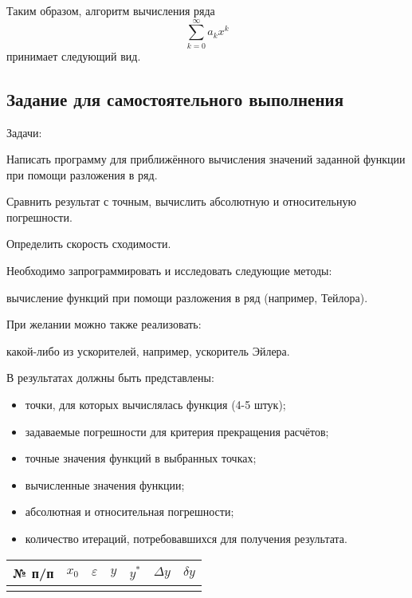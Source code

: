 Таким образом, алгоритм вычисления ряда 
\[
\sum_{k=0}^{\infty}a_{k}x^{k}
\]
принимает следующий вид.


%
%



\subsection{Задание для самостоятельного выполнения}

Задачи:

Написать программу для приближённого вычисления значений заданной
функции при помощи разложения в ряд.

Сравнить результат с точным, вычислить абсолютную и относительную
погрешности.

Определить скорость сходимости.

Необходимо запрограммировать и исследовать следующие методы:

вычисление функций при помощи разложения в ряд (например, Тейлора).

При желании можно также реализовать:

какой-либо из ускорителей, например, ускоритель Эйлера.

В результатах должны быть представлены:
\begin{itemize}
\item точки, для которых вычислялась функция (4-5 штук);
\item задаваемые погрешности для критерия прекращения расчётов;
\item точные значения функций в выбранных точках;
\item вычисленные значения функции;
\item абсолютная и относительная погрешности;
\item количество итераций, потребовавшихся для получения результата.
\end{itemize}
\begin{center}
\begin{tabular}{|c|c|c|c|c|c|c|}
\hline 
№ п/п & $x_{0}$ & $\varepsilon$ & $y$ & $y^{*}$ & $\Delta y$ & $\delta y$\tabularnewline
\hline 
\hline 
 &  &  &  &  &  & \tabularnewline
\hline 
\end{tabular}
\par\end{center}

